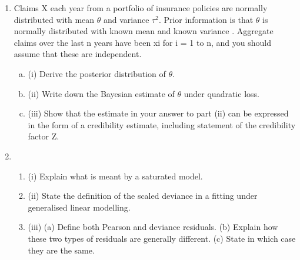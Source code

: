 \documentclass[a4paper,12pt]{article}
\begin{document}
\begin{enumerate}

\item Claims X each year from a portfolio of insurance policies are normally distributed
with mean $\theta$ and variance $\tau^2$. Prior information is that $\theta$ is normally distributed with
known mean \mu and known variance .
Aggregate claims over the last n years have been xi for i = 1 to n, and you should
assume that these are independent.
\begin{enumerate}[(a)]
\item (i) Derive the posterior distribution of $\theta$. 
\item (ii) Write down the Bayesian estimate of $\theta$ under quadratic loss. 
\item (iii) Show that the estimate in your answer to part (ii) can be expressed in the
form of a credibility estimate, including statement of the credibility factor Z.
\end{enumerate}

\item %

\begin{enumerate}
\item (i) Explain what is meant by a saturated model. 
\item(ii) State the definition of the scaled deviance in a fitting under generalised
linear modelling. 
\item (iii) (a) Define both Pearson and deviance residuals.
(b) Explain how these two types of residuals are generally different.
(c) State in which case they are the same. 
\end{enumerate}
\end{enumerate}
\newpage
\end{document}
